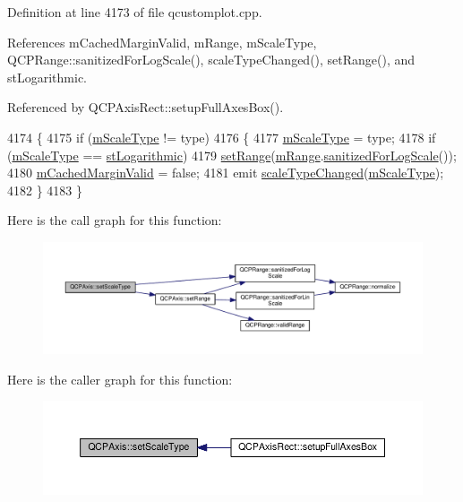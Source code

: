 Definition at line 4173 of file qcustomplot.\+cpp.



References m\+Cached\+Margin\+Valid, m\+Range, m\+Scale\+Type, Q\+C\+P\+Range\+::sanitized\+For\+Log\+Scale(), scale\+Type\+Changed(), set\+Range(), and st\+Logarithmic.



Referenced by Q\+C\+P\+Axis\+Rect\+::setup\+Full\+Axes\+Box().


\begin{DoxyCode}
4174 \{
4175   \textcolor{keywordflow}{if} (\hyperlink{class_q_c_p_axis_ad706039549cbbbec5fcb2baf7894e04d}{mScaleType} != type)
4176   \{
4177     \hyperlink{class_q_c_p_axis_ad706039549cbbbec5fcb2baf7894e04d}{mScaleType} = type;
4178     \textcolor{keywordflow}{if} (\hyperlink{class_q_c_p_axis_ad706039549cbbbec5fcb2baf7894e04d}{mScaleType} == \hyperlink{class_q_c_p_axis_a36d8e8658dbaa179bf2aeb973db2d6f0abf5b785ad976618816dc6f79b73216d4}{stLogarithmic})
4179       \hyperlink{class_q_c_p_axis_aebdfea5d44c3a0ad2b4700cd4d25b641}{setRange}(\hyperlink{class_q_c_p_axis_a1ee36773c49062d751560e11f90845f7}{mRange}.\hyperlink{class_q_c_p_range_aaf6a9046e78d91eeb8e89584fe46b034}{sanitizedForLogScale}());
4180     \hyperlink{class_q_c_p_axis_a2cde37b6e385f47e11322df4ac1b0e9b}{mCachedMarginValid} = \textcolor{keyword}{false};
4181     emit \hyperlink{class_q_c_p_axis_a3505ed8a93bd2e349d858d84996bf767}{scaleTypeChanged}(\hyperlink{class_q_c_p_axis_ad706039549cbbbec5fcb2baf7894e04d}{mScaleType});
4182   \}
4183 \}
\end{DoxyCode}


Here is the call graph for this function\+:\nopagebreak
\begin{figure}[H]
\begin{center}
\leavevmode
\includegraphics[width=350pt]{class_q_c_p_axis_adef29cae617af4f519f6c40d1a866ca6_cgraph}
\end{center}
\end{figure}




Here is the caller graph for this function\+:\nopagebreak
\begin{figure}[H]
\begin{center}
\leavevmode
\includegraphics[width=350pt]{class_q_c_p_axis_adef29cae617af4f519f6c40d1a866ca6_icgraph}
\end{center}
\end{figure}



